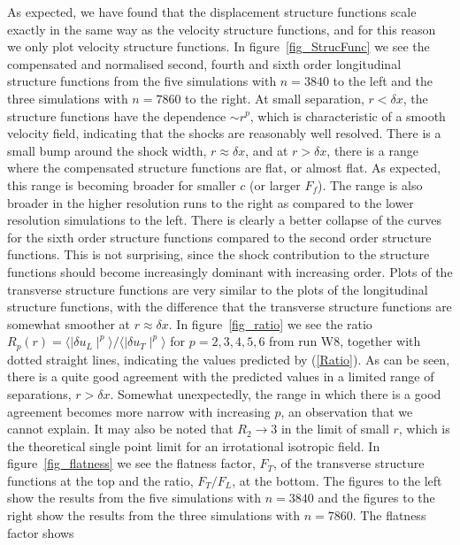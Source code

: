 As expected, we have found that the displacement structure functions scale
exactly in the same way as the velocity structure functions, and for this reason we only plot
velocity structure functions. In figure~\ref{fig_StrucFunc} we see the
compensated and normalised second, fourth and sixth order longitudinal
structure functions from the five simulations with $ n = 3840 $ to the left and
the three simulations with $ n = 7860 $ to the right. At small separation, $ r
< \delta x $, the structure functions have the dependence $ \sim r^{p} $, which
is characteristic of a smooth velocity field, indicating that the shocks are
reasonably well resolved. There is a small bump around the shock width, $ r
\approx \delta x $, and at $ r > \delta x $, there is a range where the
compensated structure functions are flat, or almost flat. As expected, this
range is becoming broader for smaller $ c $ (or larger $ F_f $). The range is
also broader in the higher resolution runs to the right as compared to the
lower resolution simulations to the left. There is clearly a better collapse of
the curves for the sixth order structure functions compared to the second order
structure functions. This is not surprising, since the shock contribution to
the structure functions should become increasingly dominant with increasing
order. Plots of the transverse structure functions are very similar to the
plots of the longitudinal structure functions, with the difference that the
transverse structure functions are somewhat smoother at $ r \approx \delta x $.
In figure~\ref{fig_ratio} we see the ratio $ R_{p}(r) = \langle \mid \delta
u_L \mid ^{p} \rangle / \langle \mid \delta u_T \mid ^{p} \rangle$ for $ p=
2,3,4,5,6 $ from run W8, together with dotted straight lines, indicating the
values predicted by (\ref{Ratio}). As can be seen, there is a quite good
agreement with the predicted values in a limited range of separations, $ r >
\delta x $. Somewhat unexpectedly, the range in which there is a good agreement
becomes more narrow with increasing $ p $, an observation that we cannot
explain. It may also be noted that $ R_2 \rightarrow 3 $ in the limit of small
$ r $, which is the theoretical single point limit for an irrotational
isotropic field. In figure~\ref{fig_flatness} we see the flatness factor, $
F_T $, of the transverse structure functions at the top and the ratio, $
F_T/F_L $, at the bottom. The figures to the left show the results from the
five simulations with $ n = 3840 $ and the figures to the right show the
results from the three simulations with $ n = 7860 $. The flatness factor shows
